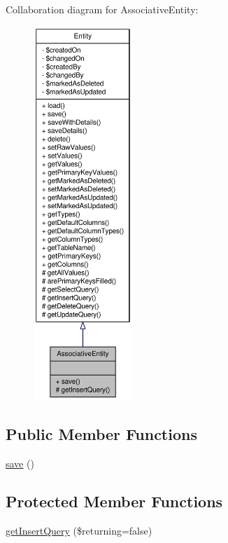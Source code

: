 Collaboration diagram for AssociativeEntity:\nopagebreak
\begin{figure}[H]
\begin{center}
\leavevmode
\includegraphics[height=400pt]{classAssociativeEntity__coll__graph}
\end{center}
\end{figure}
\subsection*{Public Member Functions}
\begin{DoxyCompactItemize}
\item 
\hyperlink{classAssociativeEntity_a6a68659dda2caa94f624ac856933a90a}{save} ()
\end{DoxyCompactItemize}
\subsection*{Protected Member Functions}
\begin{DoxyCompactItemize}
\item 
\hyperlink{classAssociativeEntity_a52105f0a9a643c01e92d6acc4dfafef3}{getInsertQuery} (\$returning=false)
\end{DoxyCompactItemize}


